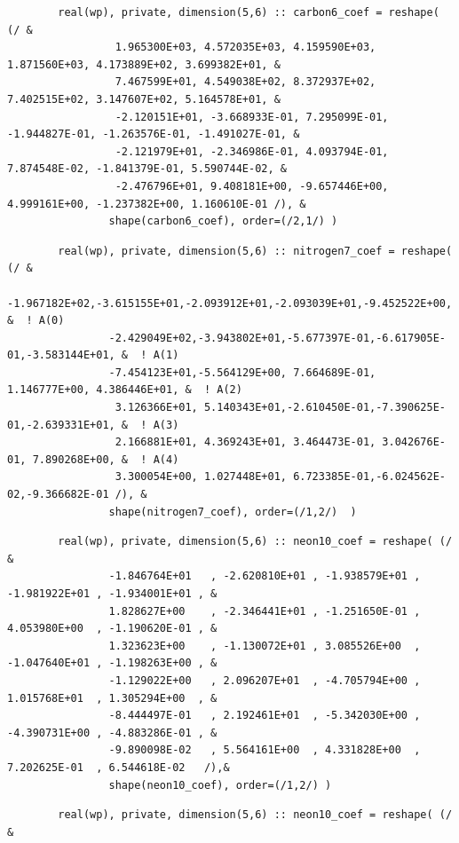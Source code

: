 \documentclass[amsmath,amssymb,a4]{revtex4-2}
\begin{document}
\begin{small}
\begin{verbatim}
        real(wp), private, dimension(5,6) :: carbon6_coef = reshape( (/ &
                 1.965300E+03, 4.572035E+03, 4.159590E+03, 1.871560E+03, 4.173889E+02, 3.699382E+01, &
                 7.467599E+01, 4.549038E+02, 8.372937E+02, 7.402515E+02, 3.147607E+02, 5.164578E+01, &
                 -2.120151E+01, -3.668933E-01, 7.295099E-01, -1.944827E-01, -1.263576E-01, -1.491027E-01, &
                 -2.121979E+01, -2.346986E-01, 4.093794E-01, 7.874548E-02, -1.841379E-01, 5.590744E-02, &
                 -2.476796E+01, 9.408181E+00, -9.657446E+00, 4.999161E+00, -1.237382E+00, 1.160610E-01 /), &
                shape(carbon6_coef), order=(/2,1/) )
\end{verbatim}
    \begin{verbatim}
        real(wp), private, dimension(5,6) :: nitrogen7_coef = reshape( (/ &
                -1.967182E+02,-3.615155E+01,-2.093912E+01,-2.093039E+01,-9.452522E+00, &  ! A(0)
                -2.429049E+02,-3.943802E+01,-5.677397E-01,-6.617905E-01,-3.583144E+01, &  ! A(1)
                -7.454123E+01,-5.564129E+00, 7.664689E-01, 1.146777E+00, 4.386446E+01, &  ! A(2)
                 3.126366E+01, 5.140343E+01,-2.610450E-01,-7.390625E-01,-2.639331E+01, &  ! A(3)
                 2.166881E+01, 4.369243E+01, 3.464473E-01, 3.042676E-01, 7.890268E+00, &  ! A(4)
                 3.300054E+00, 1.027448E+01, 6.723385E-01,-6.024562E-02,-9.366682E-01 /), &
                shape(nitrogen7_coef), order=(/1,2/)  )
\end{verbatim}
\begin{verbatim}
        real(wp), private, dimension(5,6) :: neon10_coef = reshape( (/ & 
                -1.846764E+01	, -2.620810E+01	, -1.938579E+01	, -1.981922E+01	, -1.934001E+01	, & 
                1.828627E+00	, -2.346441E+01	, -1.251650E-01	, 4.053980E+00	, -1.190620E-01	, & 
                1.323623E+00	, -1.130072E+01	, 3.085526E+00	, -1.047640E+01	, -1.198263E+00	, & 
                -1.129022E+00	, 2.096207E+01	, -4.705794E+00	, 1.015768E+01	, 1.305294E+00	, & 
                -8.444497E-01	, 2.192461E+01	, -5.342030E+00	, -4.390731E+00	, -4.883286E-01	, & 
                -9.890098E-02	, 5.564161E+00	, 4.331828E+00	, 7.202625E-01	, 6.544618E-02	 /),& 
                shape(neon10_coef), order=(/1,2/) ) 
    \end{verbatim}
    \begin{verbatim}
        real(wp), private, dimension(5,6) :: neon10_coef = reshape( (/ & 

\end{verbatim}
\end{small}
\end{document}

